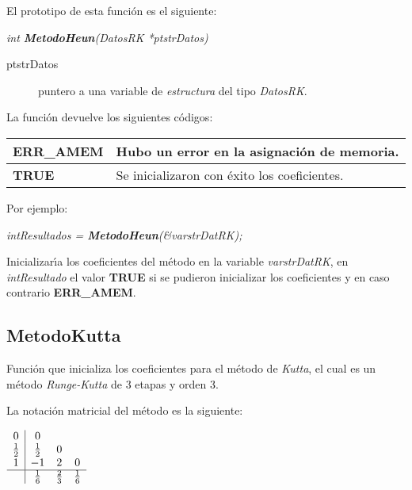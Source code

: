 El prototipo de esta funci\'on es el siguiente:

\begin{center}
\emph{int \textbf{MetodoHeun}(DatosRK *ptstrDatos)}
\end{center}

\begin{description}
\item[ptstrDatos] puntero a una variable de \emph{estructura} del tipo
\emph{DatosRK}.
\end{description}

La funci\'on devuelve los siguientes c\'odigos:

\begin{center}
\begin{tabular}{|l|l|}
\hline
\textbf{ERR\_AMEM} & Hubo un error en la asignaci\'on de memoria. \\
\hline
\textbf{TRUE} & Se inicializaron con \'exito los coeficientes. \\
\hline
\end{tabular}
\end{center}

Por ejemplo:

\begin{center}
\emph{intResultados = \textbf{MetodoHeun}(\&varstrDatRK);}
\end{center}

Inicializar\'{\i}a los coeficientes del m\'etodo en la variable
\emph{varstrDatRK}, en \emph{intResultado} el valor \textbf{TRUE} si se pudieron
inicializar los coeficientes y en caso contrario \textbf{ERR\_AMEM}.

\subsection{MetodoKutta}

Funci\'on que inicializa los coeficientes para el m\'etodo de \emph{Kutta}, el
cual es un m\'etodo \emph{Runge-Kutta} de $3$ etapas y orden $3$.\newline

La notaci\'on matricial del m\'etodo es la siguiente:

\begin{center}
$
\begin{array}{c|ccc}
0 & 0 \\
\frac{1}{2} & \frac{1}{2} & 0 \\
1 & -1 & 2 & 0 \\
\hline
 & \frac{1}{6} & \frac{2}{3} & \frac{1}{6}
\end{array}
$
\end{center}

